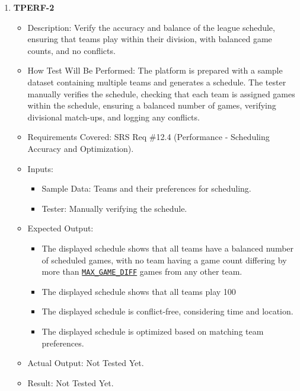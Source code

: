 \documentclass[12pt, titlepage]{article}
\begin{document}
\begin{enumerate}
\item \textbf{TPERF-2}  
    \begin{itemize}
        \item Description: Verify the accuracy and balance of the league schedule, ensuring that teams play within their division, with balanced game counts, and no conflicts.
        \item How Test Will Be Performed: The platform is prepared with a sample dataset containing multiple teams and generates a schedule. The tester manually verifies the schedule, checking that each team is assigned games within the schedule, ensuring a balanced number of games, verifying divisional match-ups, and logging any conflicts.
        \item Requirements Covered: SRS Req \#12.4 (Performance - Scheduling Accuracy and Optimization).
        \item Inputs:  
            \begin{itemize}
                \item Sample Data: Teams and their preferences for scheduling.
                \item Tester: Manually verifying the schedule.
            \end{itemize}
        \item Expected Output:  
            \begin{itemize}
                \item The displayed schedule shows that all teams have a balanced number of scheduled games, with no team having a game count differing by more than \hyperref[MAX_GAME_DIFF]{\texttt{MAX\_GAME\_DIFF}} games from any other team.
                \item The displayed schedule shows that all teams play 100%
                \item The displayed schedule is conflict-free, considering time and location.
                \item The displayed schedule is optimized based on matching team preferences.
            \end{itemize}
        \item Actual Output: Not Tested Yet.
        \item Result: Not Tested Yet.
    \end{itemize}


\end{enumerate}
\end{document}
